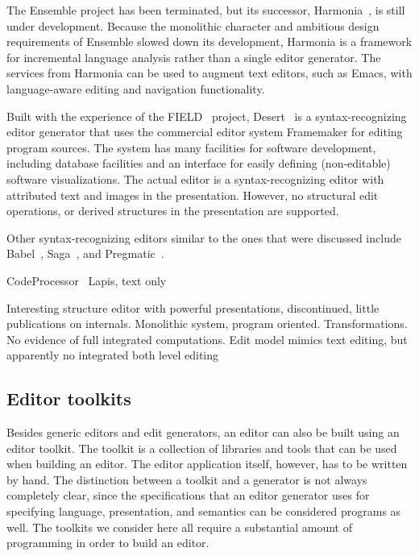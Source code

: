 \documentclass{speauth}
\begin{document}
The Ensemble project has been terminated, but its successor, Harmonia~\cite{boshernitsan01harmonia}, is still under development. Because the monolithic character and ambitious design requirements of Ensemble slowed down its development, Harmonia is a framework for incremental language analysis rather than a single editor generator. The services from Harmonia can be used to augment text editors, such as Emacs, with language-aware editing and navigation functionality.


Built with the experience of the FIELD~\cite{reiss94field} project, Desert~\cite{reiss99desert} is a syntax-recognizing editor generator that uses the commercial editor system Framemaker for editing program sources. The system has many facilities for software development, including database facilities and an interface for easily defining (non-editable) software visualizations. The actual editor is a syntax-recognizing editor with attributed text and images in the presentation. However, no structural edit operations, or derived structures in the presentation are supported.


Other syntax-recognizing editors similar to the ones that were discussed include  Babel~\cite{horton81babel}, Saga~\cite{campbell84saga}, and Pregmatic~\cite{brand92pregmatic}.


\bc
CodeProcessor~\cite{codeprocessor}
Lapis, text only

Interesting structure editor with powerful presentations, discontinued, little publications on
internals. Monolithic system, program oriented. Transformations. No evidence of full 
integrated computations. Edit model mimics text editing, but apparently no integrated
both level editing
\ec

\subsection {Editor toolkits} \label{sect:toolkits}

Besides generic editors and edit generators, an editor can also be built using an editor toolkit. The toolkit is a collection of libraries and tools that can be used when building an editor. The editor application itself, however, has to be written by hand. The distinction between a toolkit and a generator is not always completely clear, since the specifications that an editor generator uses for specifying language, presentation, and semantics can be considered programs as well. The toolkits we consider here all require a substantial amount of programming in order to build an editor.
\end{document}
